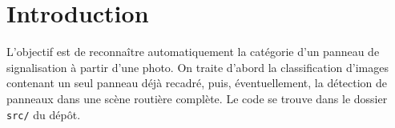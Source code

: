 \section{Introduction}

L'objectif est de reconnaître automatiquement la catégorie d'un panneau de signalisation à partir d'une photo. On traite d'abord la classification d'images contenant un seul panneau déjà recadré, puis, éventuellement, la détection de panneaux dans une scène routière complète. Le code se trouve dans le dossier \texttt{src/} du dépôt.
